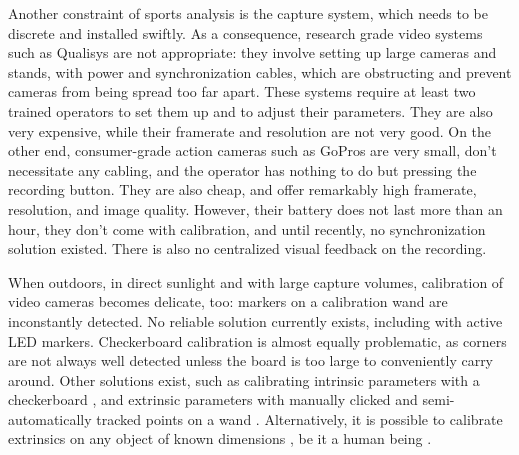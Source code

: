 Another constraint of sports analysis is the capture system, which needs to be discrete and installed swiftly. As a consequence, research grade video systems such as Qualisys are not appropriate: they involve setting up large cameras and stands, with power and synchronization cables, which are obstructing and prevent cameras from being spread too far apart. These systems require at least two trained operators to set them up and to adjust their parameters. They are also very expensive, while their framerate and resolution are not very good. On the other end, consumer-grade action cameras such as GoPros are very small, don't necessitate any cabling, and the operator has nothing to do but pressing the recording button. They are also cheap, and offer remarkably high framerate, resolution, and image quality. However, their battery does not last more than an hour, they don't come with calibration, and until recently, no synchronization solution existed. There is also no centralized visual feedback on the recording.

When outdoors, in direct sunlight and with large capture volumes, calibration of video cameras becomes delicate, too: markers on a calibration wand are inconstantly detected. No reliable solution currently exists, including with active LED markers. Checkerboard calibration is almost equally problematic, as corners are not always well detected unless the board is too large to conveniently carry around. Other solutions exist, such as calibrating intrinsic parameters with a checkerboard \cite{Zhang2000}, and extrinsic parameters with manually clicked and semi-automatically tracked points on a wand \cite{Argus2017}. 
Alternatively, it is possible to calibrate extrinsics on any object of known dimensions \cite{Dawson-Howe1994}, be it a human being \cite{Liu2022a}.

